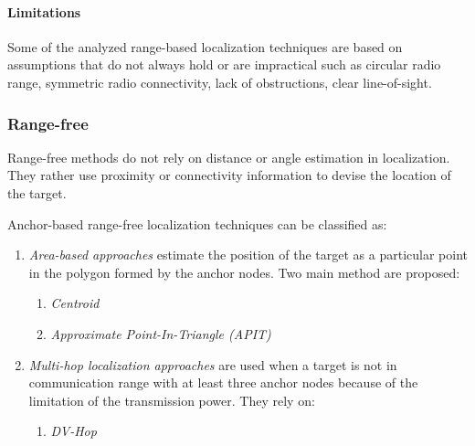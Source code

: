 \documentclass[a4paper,12pt]{article}
\begin{document}
\paragraph{Limitations}
Some of the analyzed range-based localization techniques are based on assumptions that do not always hold or are impractical such as circular radio range, symmetric radio connectivity, lack of obstructions, clear line-of-sight.

\subsubsection{Range-free}
Range-free methods do not rely on distance or angle estimation in localization. They rather use proximity or connectivity information to devise the location of the target.

Anchor-based range-free localization techniques can be classified as:
\begin{enumerate}[label=(\alph*)]
  \item \textit{Area-based approaches} estimate the position of the target as a particular point in the polygon formed by the anchor nodes. Two main method are proposed:
  \begin{enumerate}[label=(\roman*)]
    \item \textit{Centroid}
    \item \textit{Approximate Point-In-Triangle (APIT)}
  \end{enumerate}
  \item \textit{Multi-hop localization approaches} are used when a target is not in communication range with at least three anchor nodes because of the limitation of the transmission power. They rely on:
  \begin{enumerate}[label=(\roman*)]
    \item \textit{DV-Hop}
  \end{enumerate}
\end{enumerate}
\end{document}
